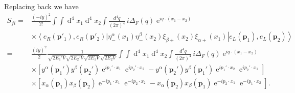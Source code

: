 Replacing back we have
\begin{align}
   S_{fi}
  =&\frac{\left( -iy \right)^{2}}{2!}\int\int \operatorname{d}^4x_1 \operatorname{d}^4x_2
\int\frac{d^4q}{(2\pi)^4}\,i\Delta_F(q)\operatorname{e}^{i q\cdot(x_1-x_2)} \nonumber\\
&\times\left\langle e_R\left(\mathbf{p}'_1\right), e_R \left(\mathbf{p}'_2\right) \right|
  \eta^{\alpha}_{-}(x_1) \eta^{\beta}_{-}(x_2)\xi_{\beta +}(x_2) \xi_{\alpha +}(x_1)
 \left| e_L \left(\mathbf{p}_1\right), e_L\left(\mathbf{p}_2\right) \right\rangle \nonumber\\
    =&\frac{\left( iy \right)^{2}}{2}\frac{1 }{\sqrt{2 E_1'V}\sqrt{2 E_2'V}\sqrt{2 E_1V}\sqrt{2 E_2V}}\int\int \operatorname{d}^4x_1 \operatorname{d}^4x_2
\int\frac{d^4q}{(2\pi)^4}\,i\Delta_F(q)\operatorname{e}^{i q\cdot(x_1-x_2)} \nonumber\\
&
 \times \left[ y^{\alpha}(\mathbf{p}_1')y^{\beta}(\mathbf{p}_2')
\operatorname{e}^{i p_1'\cdot x_1}\operatorname{e}^{i p_2'\cdot x_2}
- y^{\alpha}(\mathbf{p}_2')y^{\beta}(\mathbf{p}_1')
\operatorname{e}^{i p_1'\cdot x_2}\operatorname{e}^{i p_2'\cdot x_1}   \right] \nonumber\\
& \times \left[x_{\alpha}(\mathbf{p}_1)x_{\beta}(\mathbf{p}_2)
\operatorname{e}^{-i p_1\cdot x_1}\operatorname{e}^{-i p_2\cdot x_2} 
- x_{\alpha}(\mathbf{p}_2)x_{\beta}(\mathbf{p}_1)
\operatorname{e}^{-i p_2\cdot x_1}\operatorname{e}^{-i p_1\cdot x_2} \right].
\end{align}

